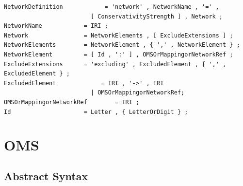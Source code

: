 \documentclass[10pt,fleqn,final]{scrreprt}
\newcommand{\sclause}[1]{\section{#1}}
\newcommand{\ssclause}[1]{\subsection{#1}}
\newenvironment{definitions}[0]{\medskip }{}
\begin{document}
\begin{definitions}
\begin{lstlisting}[language=ebnf,escapeinside={()},morecomment={[l]{\%\%\ }}]
NetworkDefinition            = 'network' , NetworkName , '=' , 
                         [ ConservativityStrength ] , Network ;
NetworkName            = IRI ;
Network                = NetworkElements , [ ExcludeExtensions ] ;
NetworkElements        = NetworkElement , { ',' , NetworkElement } ;
NetworkElement         = [ Id , ':' ] , OMSOrMappingorNetworkRef ;
ExcludeExtensions      = 'excluding' , ExcludedElement , { ',' , ExcludedElement } ;
ExcludedElement             = IRI , '->' , IRI 
                         | OMSOrMappingorNetworkRef;
OMSOrMappingorNetworkRef        = IRI ;
Id                     = Letter , { LetterOrDigit } ;
\end{lstlisting}

\sclause{OMS}\label{c:OMS}
\ssclause{Abstract Syntax}


\end{definitions}
\end{document}

